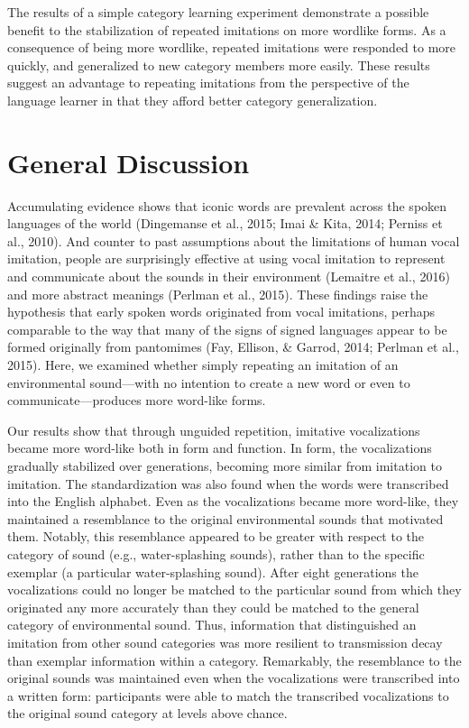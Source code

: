 \documentclass[english,floatsintext,man]{apa6}
\theoremstyle{definition}
\theoremstyle{definition}
\theoremstyle{definition}
\theoremstyle{remark}
\begin{document}
The results of a simple category learning experiment demonstrate a
possible benefit to the stabilization of repeated imitations on more
wordlike forms. As a consequence of being more wordlike, repeated
imitations were responded to more quickly, and generalized to new
category members more easily. These results suggest an advantage to
repeating imitations from the perspective of the language learner in
that they afford better category generalization.

\hypertarget{general-discussion}{%
\section{General Discussion}\label{general-discussion}}

Accumulating evidence shows that iconic words are prevalent across the
spoken languages of the world (Dingemanse et al., 2015; Imai \& Kita,
2014; Perniss et al., 2010). And counter to past assumptions about the
limitations of human vocal imitation, people are surprisingly effective
at using vocal imitation to represent and communicate about the sounds
in their environment (Lemaitre et al., 2016) and more abstract meanings
(Perlman et al., 2015). These findings raise the hypothesis that early
spoken words originated from vocal imitations, perhaps comparable to the
way that many of the signs of signed languages appear to be formed
originally from pantomimes (Fay, Ellison, \& Garrod, 2014; Perlman et
al., 2015). Here, we examined whether simply repeating an imitation of
an environmental sound---with no intention to create a new word or even
to communicate---produces more word-like forms.

Our results show that through unguided repetition, imitative
vocalizations became more word-like both in form and function. In form,
the vocalizations gradually stabilized over generations, becoming more
similar from imitation to imitation. The standardization was also found
when the words were transcribed into the English alphabet. Even as the
vocalizations became more word-like, they maintained a resemblance to
the original environmental sounds that motivated them. Notably, this
resemblance appeared to be greater with respect to the category of sound
(e.g., water-splashing sounds), rather than to the specific exemplar (a
particular water-splashing sound). After eight generations the
vocalizations could no longer be matched to the particular sound from
which they originated any more accurately than they could be matched to
the general category of environmental sound. Thus, information that
distinguished an imitation from other sound categories was more
resilient to transmission decay than exemplar information within a
category. Remarkably, the resemblance to the original sounds was
maintained even when the vocalizations were transcribed into a written
form: participants were able to match the transcribed vocalizations to
the original sound category at levels above chance.
\end{document}
